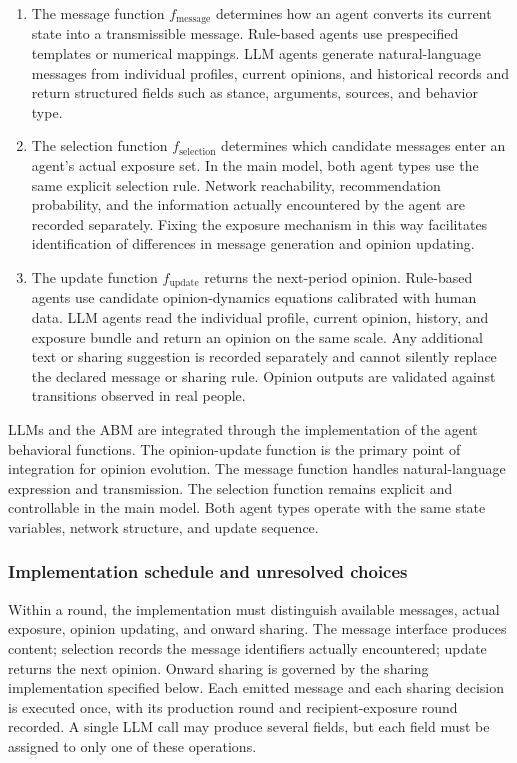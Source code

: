 \documentclass[11pt,a4paper]{article}
\begin{document}
\begin{enumerate}
\item The message function $f_{\text{message}}$ determines how an agent converts its current state into a transmissible message. Rule-based agents use prespecified templates or numerical mappings. LLM agents generate natural-language messages from individual profiles, current opinions, and historical records and return structured fields such as stance, arguments, sources, and behavior type.
\item The selection function $f_{\text{selection}}$ determines which candidate messages enter an agent's actual exposure set. In the main model, both agent types use the same explicit selection rule. Network reachability, recommendation probability, and the information actually encountered by the agent are recorded separately. Fixing the exposure mechanism in this way facilitates identification of differences in message generation and opinion updating.
\item The update function $f_{\text{update}}$ returns the next-period opinion. Rule-based agents use candidate opinion-dynamics equations calibrated with human data. LLM agents read the individual profile, current opinion, history, and exposure bundle and return an opinion on the same scale. Any additional text or sharing suggestion is recorded separately and cannot silently replace the declared message or sharing rule. Opinion outputs are validated against transitions observed in real people.
\end{enumerate}

LLMs and the ABM are integrated through the implementation of the agent behavioral functions. The opinion-update function is the primary point of integration for opinion evolution. The message function handles natural-language expression and transmission. The selection function remains explicit and controllable in the main model. Both agent types operate with the same state variables, network structure, and update sequence.

\subsubsection{Implementation schedule and unresolved choices}

Within a round, the implementation must distinguish available messages, actual exposure, opinion updating, and onward sharing. The message interface produces content; selection records the message identifiers actually encountered; update returns the next opinion. Onward sharing is governed by the sharing implementation specified below. Each emitted message and each sharing decision is executed once, with its production round and recipient-exposure round recorded. A single LLM call may produce several fields, but each field must be assigned to only one of these operations.
\end{document}
